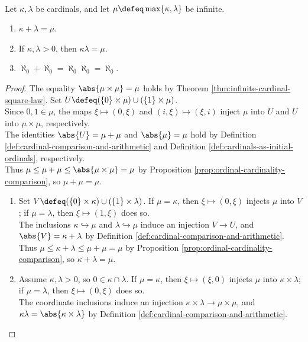 \begin{theorem} \label{thm:infinite-cardinal-absorption-reference} \\
Let $\kappa,\lambda$ be cardinals, and let $\mu\defeq\max\{\kappa,\lambda\}$ be infinite.
\begin{enumerate}[label=(\roman*)]
\setlength{\itemsep}{0pt}
\item $\kappa+\lambda=\mu$.
\item If $\kappa,\lambda>0$, then $\kappa\lambda=\mu$.
\item $\aleph_0+\aleph_0=\aleph_0\aleph_0=\aleph_0$.
\end{enumerate}
\begin{proof}
The equality $\abs{\mu\times\mu}=\mu$ holds by Theorem \ref{thm:infinite-cardinal-square-law}. Set $U\defeq(\{0\}\times\mu)\cup(\{1\}\times\mu)$.\\
Since $0,1\in\mu$, the maps $\xi\mapsto(0,\xi)$ and $(i,\xi)\mapsto(\xi,i)$ inject $\mu$ into $U$ and $U$ into $\mu\times\mu$, respectively.\\
The identities $\abs{U}=\mu+\mu$ and $\abs{\mu}=\mu$ hold by Definition \ref{def:cardinal-comparison-and-arithmetic} and Definition \ref{def:cardinals-as-initial-ordinals}, respectively.\\
Thus $\mu\leq\mu+\mu\leq\abs{\mu\times\mu}=\mu$ by Proposition \ref{prop:ordinal-cardinality-comparison}, so $\mu+\mu=\mu$.
\begin{enumerate}[label=(\roman*)]
\setlength{\itemsep}{0pt}
\item Set $V\defeq(\{0\}\times\kappa)\cup(\{1\}\times\lambda)$. If $\mu=\kappa$, then $\xi\mapsto(0,\xi)$ injects $\mu$ into $V$; if $\mu=\lambda$, then $\xi\mapsto(1,\xi)$ does so.\\
The inclusions $\kappa\hookrightarrow\mu$ and $\lambda\hookrightarrow\mu$ induce an injection $V\to U$, and $\abs{V}=\kappa+\lambda$ by Definition \ref{def:cardinal-comparison-and-arithmetic}.\\
Thus $\mu\leq\kappa+\lambda\leq\mu+\mu=\mu$ by Proposition \ref{prop:ordinal-cardinality-comparison}, so $\kappa+\lambda=\mu$.
\item Assume $\kappa,\lambda>0$, so $0\in\kappa\cap\lambda$. If $\mu=\kappa$, then $\xi\mapsto(\xi,0)$ injects $\mu$ into $\kappa\times\lambda$; if $\mu=\lambda$, then $\xi\mapsto(0,\xi)$ does so.\\
The coordinate inclusions induce an injection $\kappa\times\lambda\to\mu\times\mu$, and $\kappa\lambda=\abs{\kappa\times\lambda}$ by Definition \ref{def:cardinal-comparison-and-arithmetic}.\\

\end{enumerate}
\end{proof}
\end{theorem}

